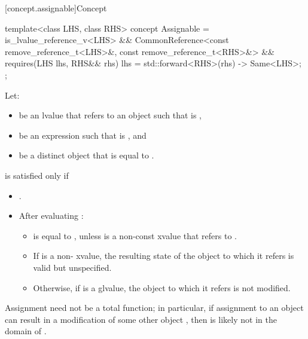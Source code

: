 [concept.assignable]{Concept }

%
\begin{itemdecl}
template<class LHS, class RHS>
  concept Assignable =
    is_lvalue_reference_v<LHS> &&
    CommonReference<const remove_reference_t<LHS>&, const remove_reference_t<RHS>&> &&
    requires(LHS lhs, RHS&& rhs) {
      { lhs = std::forward<RHS>(rhs) } -> Same<LHS>;
    };
\end{itemdecl}

\begin{itemdescr}
\pnum
Let:
\begin{itemize}
\item {} be an lvalue that refers to an object  such that
   is ,
\item {} be an expression such that  is
  , and
\item {} be a distinct object that is equal to .
\end{itemize}
 is satisfied only if

\begin{itemize}
\item {}.

\item After evaluating :

\begin{itemize}
\item {} is equal to , unless  is a non-const
xvalue that refers to .

\item If  is a non- xvalue, the resulting state of the
object to which it refers is valid but unspecified.

\item Otherwise, if  is a glvalue, the object to which it refers is
  not modified.
\end{itemize}
\end{itemize}

\pnum
\begin{note}
Assignment need not be a total function;
in particular, if assignment to an object  can result in a modification
of some other object , then  is likely not in the domain
of \tcode{=}.
\end{note}
\end{itemdescr}

